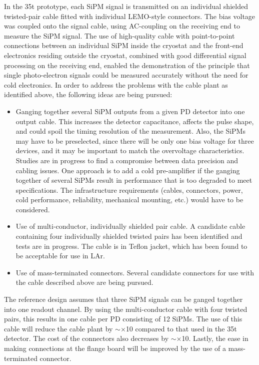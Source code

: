 In the 35t prototype, each SiPM signal is transmitted on an
individual shielded twisted-pair cable fitted with individual
LEMO-style connectors.  The bias voltage was coupled onto the signal
cable, using AC-coupling on the receiving end to measure the SiPM
signal.  The use of high-quality cable with point-to-point connections
between an individual SiPM inside the cryostat and the front-end
electronics residing outside the cryostat, combined with good
differential signal processing on the receiving end, enabled the
demonstration of the principle that single photo-electron signals
could be measured accurately without the need for cold electronics.
In order to address the problems with the cable plant as identified
above, the following ideas are being pursued:
\begin{itemize}
\item Ganging together several SiPM outputs from a given PD
  detector into one output cable.  This increases the detector
  capacitance, affects the pulse shape, and could spoil the timing
  resolution of the measurement.  Also, the SiPMs may have to be
  preselected, since there will be only one bias voltage for three
  devices, and it may be important to match the overvoltage
  characteristics.  Studies are in progress to find a compromise
  between data precision and cabling issues. One approach is to add a
  cold pre-amplifier if the ganging together of several SiPMs result
  in performance that is too degraded to meet specifications.  The
  infrastructure requirements (cables, connectors, power, cold
  performance, reliability, mechanical mounting, etc.) would have to
  be considered.

\item Use of multi-conductor, individually shielded pair  cable.  A
  candidate cable containing four individually shielded twisted pairs
  has been identified and tests are in progress.  The cable is in
  Teflon jacket, which has been found to be acceptable for use in LAr.

\item Use of mass-terminated connectors.  Several candidate connectors
  for use with the cable described above are being pursued.
\end{itemize}

The reference design assumes that three SiPM signals can be ganged
together into one readout channel.  By using the multi-conductor cable
with four twisted pairs, this results in one cable per PD consisting
of 12 SiPMs.  The use of this cable will reduce the cable plant by
$\sim \times$10 compared to that used in the 35t detector.  The cost
of the connectors also decreases by $\sim \times$10.  Lastly, the ease
in making connections at the flange board will be improved by the use
of a mass-terminated connector.

